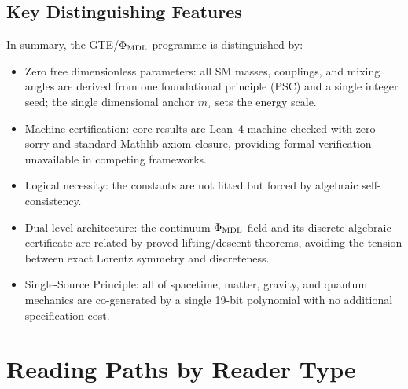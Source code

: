 \documentclass[11pt]{article}
\begin{document}
\subsection{Key Distinguishing Features}

In summary, the GTE/$\Phi_{\rm MDL}$ programme is distinguished by:
\begin{itemize}[leftmargin=1.5em,itemsep=0.15em]
  \item Zero free dimensionless parameters: all SM masses, couplings, and mixing angles
    are derived from one foundational principle (PSC) and a single integer seed; the
    single dimensional anchor $m_\tau$ sets the energy scale.
  \item Machine certification: core results are Lean~4 machine-checked with zero
    sorry and standard Mathlib axiom closure, providing formal verification
    unavailable in competing frameworks.
  \item Logical necessity: the constants are not fitted but forced by algebraic
    self-consistency.
  \item Dual-level architecture: the continuum $\Phi_{\rm MDL}$ field and its discrete
    algebraic certificate are related by proved lifting/descent theorems, avoiding the
    tension between exact Lorentz symmetry and discreteness.
  \item Single-Source Principle: all of spacetime, matter, gravity, and quantum mechanics
    are co-generated by a single 19-bit polynomial with no additional specification cost.
\end{itemize}

\section{Reading Paths by Reader Type}
\label{sec:readingpaths}
\end{document}
